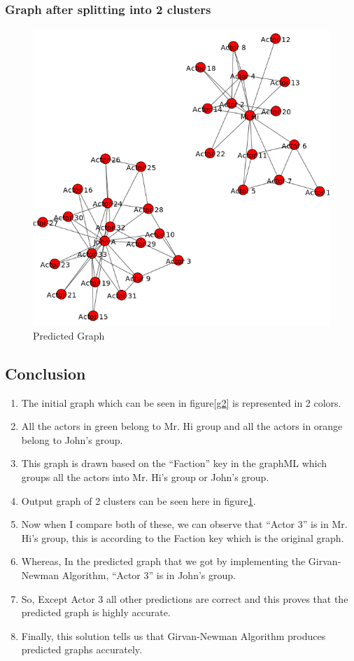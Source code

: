 \subsubsection{Graph after splitting into 2 clusters}
\begin{figure}[ht]    
    \begin{center}
        \includegraphics[scale=0.5]{output1.png}
         \caption{Predicted Graph}
        \label{g4}
    \end{center}
\end{figure}
\newpage

\subsection{Conclusion}
\begin{enumerate}
\item The initial graph which can be seen in figure\ref{g2} is represented in 2 colors.
\item All the actors in green belong to Mr. Hi group and all the actors in orange belong to John's group.
\item This graph is drawn based on the ``Faction'' key in the graphML which groups all the actors into Mr. Hi's group or John's group.
\item Output graph of 2 clusters can be seen here in figure\ref{g4}.
\item Now when I compare both of these, we can observe that ``Actor 3'' is in Mr. Hi's group, this is according to the Faction key which is the original graph.
\item Whereas, In the predicted graph that we got by implementing the Girvan-Newman Algorithm, ``Actor 3'' is in John's group.
\item So, Except Actor 3 all other predictions are correct and this proves that the predicted graph is highly accurate. 
\item Finally, this solution tells us that Girvan-Newman Algorithm produces predicted graphs accurately.

\end{enumerate}
